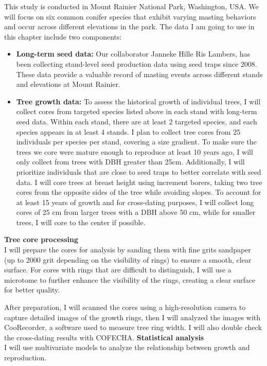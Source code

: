 \documentclass[11pt,letter]{article}
\begin{document}
This study is conducted in Mount Rainier National Park, Washington, USA. We will focus on six common conifer species that exhibit varying masting behaviors and occur across different elevations in the park. The data I am going to use in this chapter include two components:
\begin{itemize}
	\item \textbf{Long-term seed data:} Our collaborator Janneke Hille Ris Lambers, has been collecting stand-level seed production data using seed traps since 2008. These data provide a valuable record of masting events across different stands and elevations at Mount Rainier.
	\item \textbf{Tree growth data:}  To assess the historical growth of individual trees, I will collect cores from targeted species listed above in each stand with long-term seed data. Within each stand, there are at least 2 targeted species, and each species appears in at least 4 stands. I plan to collect tree cores from 25 individuals per species per stand, covering a size gradient. To make sure the trees we core were mature enough to reproduce at least 10 years ago, I will only collect from trees with DBH greater than 25cm. Additionally, I will prioritize individuals that are close to seed traps to better correlate with seed data. I will core trees at breast height using increment borers, taking two tree cores from the opposite sides of the tree while avoiding slopes. To account for at least 15 years of growth and for cross-dating purposes, I will collect long cores of 25 cm from larger trees with a DBH above 50 cm, while for smaller trees, I will core to the center if possible.
	\end{itemize}
\textbf{Tree core processing}\\
I will prepare the cores for analysis by sanding them with fine grits sandpaper (up to 2000 grit depending on the visibility of rings) to ensure a smooth, clear surface. For cores with rings that are difficult to distinguish, I will use a microtome to further enhance the visibility of the rings, creating a clear surface for better quality.\par
After preparation, I will scanned the cores using a high-resolution camera to capture detailed images of the growth rings, then I will analyzed the images with CooRecorder, a software used to measure tree ring width. I will also double check the cross-dating results with COFECHA.
\textbf{Statistical analysis}\\
I will use multivariate models to analyze the relationship between growth and reproduction.
\end{document}
